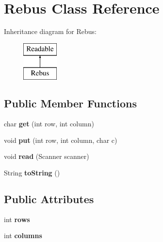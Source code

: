 \hypertarget{classRebus}{
\section{Rebus Class Reference}
\label{classRebus}
}
Inheritance diagram for Rebus:\begin{figure}[H]
\begin{center}
\leavevmode
\includegraphics[height=2.000000cm]{classRebus}
\end{center}
\end{figure}
\subsection*{Public Member Functions}
\begin{DoxyCompactItemize}
\item 
\hypertarget{classRebus_a2495b8ab66b8b5fc73be661e6ccb85d3}{
char {\bfseries get} (int row, int column)}
\label{classRebus_a2495b8ab66b8b5fc73be661e6ccb85d3}

\item 
\hypertarget{classRebus_a33c68ead613e1cad7e1e274451f769c0}{
void {\bfseries put} (int row, int column, char c)}
\label{classRebus_a33c68ead613e1cad7e1e274451f769c0}

\item 
\hypertarget{classRebus_ab1ffa625317a5f6f05c75ec072a4bf53}{
void {\bfseries read} (Scanner scanner)}
\label{classRebus_ab1ffa625317a5f6f05c75ec072a4bf53}

\item 
\hypertarget{classRebus_ad208ddcbae9a498c5e8ef2beec2a3306}{
String {\bfseries toString} ()}
\label{classRebus_ad208ddcbae9a498c5e8ef2beec2a3306}

\end{DoxyCompactItemize}
\subsection*{Public Attributes}
\begin{DoxyCompactItemize}
\item 
\hypertarget{classRebus_a0d21b9515af691a04c515a3c163bd683}{
int {\bfseries rows}}
\label{classRebus_a0d21b9515af691a04c515a3c163bd683}

\item 
\hypertarget{classRebus_a71ec10584853e625028ea0c7c4932256}{
int {\bfseries columns}}
\label{classRebus_a71ec10584853e625028ea0c7c4932256}

\end{DoxyCompactItemize}
